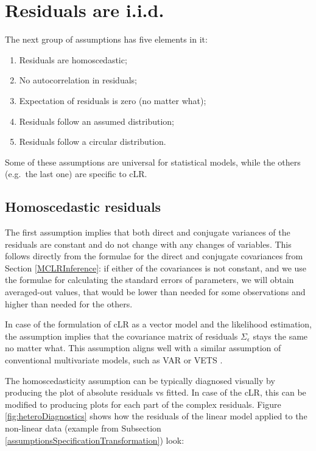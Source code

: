 \documentclass[
]{book}
\providecommand{\tightlist}{%
  \setlength{\itemsep}{0pt}\setlength{\parskip}{0pt}}
\begin{document}
\hypertarget{assumptionsResiduals}{%
\section{Residuals are i.i.d.}\label{assumptionsResiduals}}

The next group of assumptions has five elements in it:

\begin{enumerate}
\def\labelenumi{\arabic{enumi}.}
\tightlist
\item
  Residuals are homoscedastic;
\item
  No autocorrelation in residuals;
\item
  Expectation of residuals is zero (no matter what);
\item
  Residuals follow an assumed distribution;
\item
  Residuals follow a circular distribution.
\end{enumerate}

Some of these assumptions are universal for statistical models, while the others (e.g.~the last one) are specific to cLR.

\hypertarget{assumptionsResidualsHomoscedastic}{%
\subsection{Homoscedastic residuals}\label{assumptionsResidualsHomoscedastic}}

The first assumption implies that both direct and conjugate variances of the residuals are constant and do not change with any changes of variables. This follows directly from the formulae for the direct and conjugate covariances from Section \ref{MCLRInference}: if either of the covariances is not constant, and we use the formulae for calculating the standard errors of parameters, we will obtain averaged-out values, that would be lower than needed for some observations and higher than needed for the others.

In case of the formulation of cLR as a vector model and the likelihood estimation, the assumption implies that the covariance matrix of residuals \(\Sigma_\epsilon\) stays the same no matter what. This assumption aligns well with a similar assumption of conventional multivariate models, such as VAR \citep{Lutkepohl} or VETS \citep{SvetunkovVETS}.

The homoscedasticity assumption can be typically diagnosed visually by producing the plot of absolute residuals vs fitted. In case of the cLR, this can be modified to producing plots for each part of the complex residuals. Figure \ref{fig:heteroDiagnostics} shows how the residuals of the linear model applied to the non-linear data (example from Subsection \ref{assumptionsSpecificationTransformation}) look:
\end{document}
